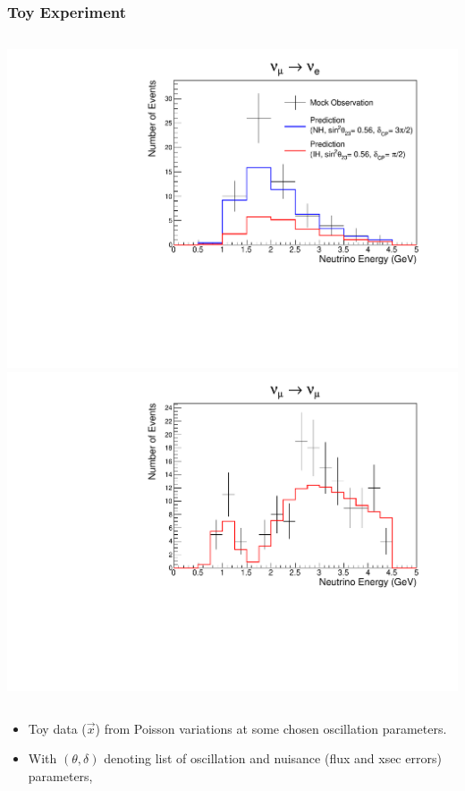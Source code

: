 \documentclass[9pt, aspectratio=169]{beamer}
\begin{document}
\begin{frame}
  \frametitle{Toy Experiment}
  \begin{columns}
    \includegraphics[scale=0.35]{figures_final/datamc_nue.pdf}
    \includegraphics[scale=0.35]{figures_final/datamc_numu.pdf}
  \end{columns}
  \bigskip
  \begin{itemize}
    \item Toy data ($\vec{x}$) from Poisson variations at some chosen oscillation parameters.
    \item With $(\theta, \delta)$ denoting list of oscillation and nuisance (flux and xsec errors) parameters, 

\end{itemize}
\end{frame}
\end{document}
